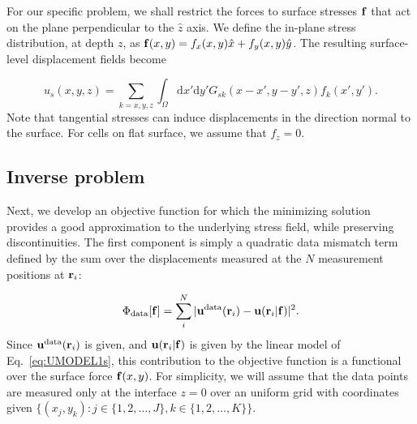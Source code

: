 \documentclass[aps,prl,reprint,groupedaddress,twocolumn]{revtex4-1}
\def\dd{\mbox{d}}
\def\f{{\bf f}}
\def\r{{\bf r}}
\def\u{{\bf u}}
\begin{document}
For our specific problem, we shall restrict the forces to surface
stresses $\f$ that act on the plane perpendicular to the
$\hat{z}$ axis. We define the in-plane stress distribution, at depth $z$, as
$\f(x,y) = f_{x}(x,y)\hat{x} + f_{y}(x,y)\hat{y}$. 
The resulting surface-level displacement fields become

\begin{equation}
u_{s}(x,y,z) = \sum_{k=x,y,z}\int_\Omega \dd x'\dd y'G_{sk}(x-x',y-y',z)f_{k}(x',y').
\label{eq:UMODEL1s}
\end{equation}
%
Note that tangential stresses can induce
displacements in the direction normal to the surface.
For cells on flat surface, we assume that $f_{z}=0$.

\subsection{Inverse problem}

Next, we develop an objective function for which the minimizing
solution provides a good approximation to the underlying stress field,
while preserving discontinuities.  The first component is simply a
quadratic data mismatch term defined by the sum over the displacements
measured at the $N$ measurement positions at $\r_{i}$:

\begin{equation}
\Phi_{\rm data}[\f] = \sum_{i}^{N}\vert \u^{\rm
  data}(\r_{i})- \u(\r_i\vert \f)\vert^{2}.
\label{PHIDATA}
\end{equation}
%
Since $\u^{\rm data}(\r_{i})$ is given, and $\u(\r_{i}\vert \f)$ is
given by the linear model of Eq.~\ref{eq:UMODEL1s}, this contribution
to the objective function is a functional over the surface force
$\f(x,y)$.  For simplicity, we will assume that the data points are
measured only at the interface $z=0$ over an uniform grid with
coordinates given $\{ (x_j,y_k) : j\in\{1,2,\ldots,J\},
k\in\{1,2,\ldots,K\}\}.$
\end{document}

